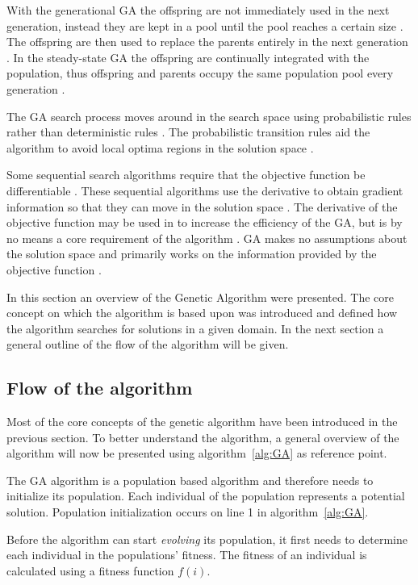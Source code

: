 With the generational GA the offspring are not immediately used in the next generation, instead they are kept in a pool until the pool reaches a certain size \cite{FamilyGA}. The offspring are then used to replace the parents entirely in the next generation \cite{FamilyGA}. In the steady-state GA the offspring are continually integrated with the population, thus offspring and parents occupy the same population pool every generation \cite{GeostatisticalGA,FamilyGA}.

The GA search process moves around in the search space using probabilistic rules rather than deterministic rules \cite{FamilyGA}. The probabilistic transition rules aid the algorithm to avoid local optima regions in the solution space \cite{HybridIntelliGA}. 

Some sequential search algorithms require that the objective function be differentiable \cite{ConstrainedGA}. These sequential algorithms use the derivative to obtain gradient information so that they can move in the solution space \cite{ConstrainedGA,SelfAdaptiveGA}. The derivative of the objective function may be used in to increase the efficiency of the GA, but is by no means a core requirement of the algorithm \cite{ConstrainedGA,HybridIntelliGA,SelfAdaptiveGA}. GA makes no assumptions about the solution space and primarily works on the information provided by the objective function \cite{ConstrainedGA,HybridIntelliGA}. 

In this section an overview of the Genetic Algorithm were presented. The core concept on which the algorithm is based upon was introduced and defined how the algorithm searches for solutions in a given domain. In the next section a general outline of the flow of the algorithm will be given.

\subsection{Flow of the algorithm}
Most of the core concepts of the genetic algorithm have been introduced in the previous section. To better understand the algorithm, a general overview of the algorithm will now be presented using algorithm~\ref{alg:GA} as reference point.

The GA algorithm is a population based algorithm and therefore needs to initialize its population. Each individual of the population represents a potential solution. Population initialization occurs on line 1 in algorithm~\ref{alg:GA}.

Before the algorithm can start \emph{evolving} its population, it first needs to determine each individual in the populations' fitness. The fitness of an individual is calculated using a fitness function $f(i)$.

